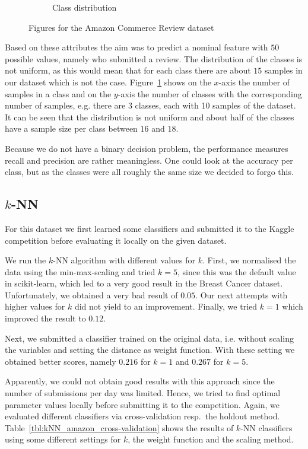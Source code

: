 \documentclass[a4paper,11pt]{article}
\begin{document}
\begin{figure}[h!]
\begin{subfigure}[c]{0.45\textwidth}
            \caption{Class distribution}
            \label{fig:amazon_classes_bar}
        \end{subfigure}
        \caption{Figures for the Amazon Commerce Review dataset}
        \label{fig:amazon}
    \end{figure}
    
    Based on these attributes the aim was to predict a nominal feature with $50$ possible values, namely who submitted a review. The distribution of the classes is not uniform, as this would mean that for each class there are about $15$ samples in our dataset which is not the case. Figure~\ref{fig:amazon_classes_bar} shows on the $x$-axis the number of samples in a class and on the $y$-axis the number of classes with the corresponding number of samples, e.g. there are 3 classes, each with 10 samples of the dataset. It can be seen that the distribution is not uniform and about half of the classes have a sample size per class between $16$ and $18$.
    
    Because we do not have a binary decision problem, the performance measures recall and precision are rather meaningless. One could look at the accuracy per class, but as the classes were all roughly the same size we decided to forgo this.

    \subsection{$k$-NN}
        For this dataset we first learned some classifiers and submitted it to the Kaggle competition before evaluating it locally on the given dataset.
        
        We run the $k$-NN algorithm with different values for $k$. 
        First, we normalised the data using the min-max-scaling and tried $k=5$, since this was the default value in scikit-learn, which led to a very good result in the Breast Cancer dataset. Unfortunately, we obtained a very bad result of $0.05$. Our next attempts with higher values for $k$ did not yield to an improvement. Finally, we tried $k=1$ which improved the result to $0.12$.
        
        Next, we submitted a classifier trained on the original data, i.e. without scaling the variables and setting the distance as weight function. With these setting we obtained better scores, namely $0.216$ for $k=1$ and $0.267$ for $k=5$. 
        
        Apparently, we could not obtain good results with this approach since the number of submissions per day was limited. Hence, we tried to find optimal parameter values locally before submitting it to the competition. Again, we evaluated different classifiers via cross-validation resp.\ the holdout method. Table~\ref{tbl:kNN_amazon_cross-validation} shows the results of $k$-NN classifiers using some different settings for $k$, the weight function and the scaling method.
        
\end{document}

